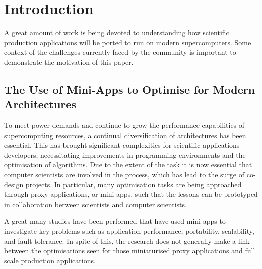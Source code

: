 \documentclass[runningheads,a4paper]{llncs}
\begin{document}
\section{Introduction}

A great amount of work is being devoted to understanding how scientific production applications will be ported to run on modern supercomputers. Some context of the challenges currently faced by the community is important to demonstrate the motivation of this paper. 

\subsection{The Use of Mini-Apps to Optimise for Modern Architectures}

To meet power demands and continue to grow the performance capabilities of supercomputing resources, a continual diversification of architectures has been essential. This has brought significant complexities for scientific applications developers, necessitating improvements in programming environments and the optimisation of algorithms. Due to the extent of the task it is now essential that computer scientists are involved in the process, which has lead to the surge of co-design projects. In particular, many optimisation tasks are being approached through proxy applications, or mini-apps, such that the lessons can be prototyped in collaboration between scientists and computer scientists.

A great many studies have been performed that have used mini-apps to investigate key problems such as application performance, portability, scalability, and fault tolerance. In spite of this, the research does not generally make a link between the optimisations seen for those miniaturised proxy applications and full scale production applications.

\end{document}
